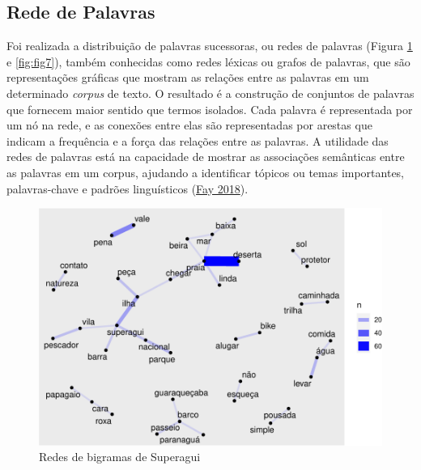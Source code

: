 \documentclass[preprint, 3p,
authoryear]{elsarticle} %
\begin{document}
\hypertarget{rede-de-palavras}{%
\subsection{Rede de Palavras}\label{rede-de-palavras}}

Foi realizada a distribuição de palavras sucessoras, ou redes de
palavras (Figura \ref{fig:fig6} e \ref{fig:fig7}), também conhecidas
como redes léxicas ou grafos de palavras, que são representações
gráficas que mostram as relações entre as palavras em um determinado
\emph{corpus} de texto. O resultado é a construção de conjuntos de
palavras que fornecem maior sentido que termos isolados. Cada palavra é
representada por um nó na rede, e as conexões entre elas são
representadas por arestas que indicam a frequência e a força das
relações entre as palavras. A utilidade das redes de palavras está na
capacidade de mostrar as associações semânticas entre as palavras em um
corpus, ajudando a identificar tópicos ou temas importantes,
palavras-chave e padrões linguísticos
(\protect\hyperlink{ref-Fay2018}{Fay 2018}).

\begin{figure}[H]

{\centering \includegraphics{bookdown-artigo_files/figure-latex/fig6-1} 

}

\caption{Redes de bigramas de Superagui}\label{fig:fig6}
\end{figure}
\end{document}
